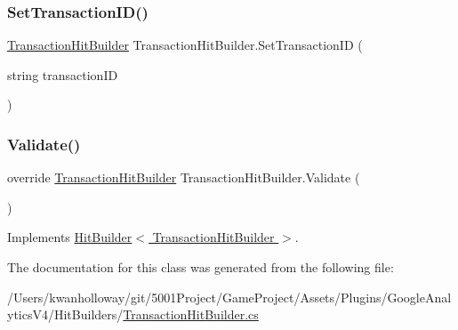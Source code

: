 \mbox{\label{class_transaction_hit_builder_a7e08a8d0c67790c190c1f8ce847d37b6}} 
\subsubsection{\texorpdfstring{Set\+Transaction\+I\+D()}{SetTransactionID()}}
{\footnotesize\ttfamily \hyperlink{class_transaction_hit_builder}{Transaction\+Hit\+Builder} Transaction\+Hit\+Builder.\+Set\+Transaction\+ID (\begin{DoxyParamCaption}\item[{string}]{transaction\+ID }\end{DoxyParamCaption})}

\mbox{\label{class_transaction_hit_builder_a6bde66350f8ccd032418d150f9bae1f9}} 
\subsubsection{\texorpdfstring{Validate()}{Validate()}}
{\footnotesize\ttfamily override \hyperlink{class_transaction_hit_builder}{Transaction\+Hit\+Builder} Transaction\+Hit\+Builder.\+Validate (\begin{DoxyParamCaption}{ }\end{DoxyParamCaption})\hspace{0.3cm}{\ttfamily [virtual]}}



Implements \hyperlink{class_hit_builder_a0f4833828bd530bb057c9ca359584bce}{Hit\+Builder$<$ Transaction\+Hit\+Builder $>$}.



The documentation for this class was generated from the following file\+:\begin{DoxyCompactItemize}
\item 
/\+Users/kwanholloway/git/5001\+Project/\+Game\+Project/\+Assets/\+Plugins/\+Google\+Analytics\+V4/\+Hit\+Builders/\hyperlink{_transaction_hit_builder_8cs}{Transaction\+Hit\+Builder.\+cs}\end{DoxyCompactItemize}

